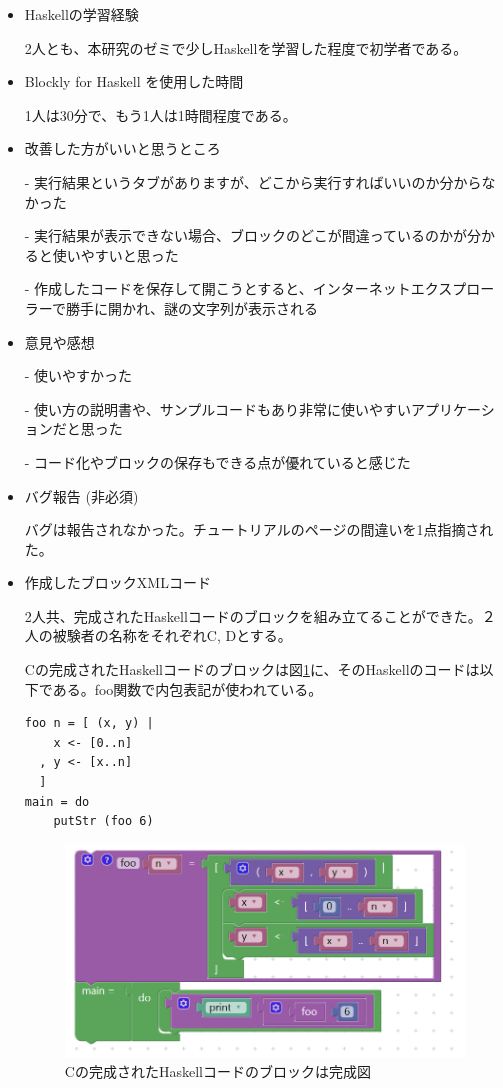 \documentclass{risepaper}
\begin{document}
\begin{itemize}
\item Haskellの学習経験

2人とも、本研究のゼミで少しHaskellを学習した程度で初学者である。

\item Blockly for Haskell を使用した時間

1人は30分で、もう1人は1時間程度である。

\item 改善した方がいいと思うところ

- 実行結果というタブがありますが、どこから実行すればいいのか分からなかった

- 実行結果が表示できない場合、ブロックのどこが間違っているのかが分かると使いやすいと思った

- 作成したコードを保存して開こうとすると、インターネットエクスプローラーで勝手に開かれ、謎の文字列が表示される

\item 意見や感想

- 使いやすかった

- 使い方の説明書や、サンプルコードもあり非常に使いやすいアプリケーションだと思った

- コード化やブロックの保存もできる点が優れていると感じた

\item バグ報告 (非必須)

バグは報告されなかった。チュートリアルのページの間違いを1点指摘された。

\item 作成したブロックXMLコード

2人共、完成されたHaskellコードのブロックを組み立てることができた。２人の被験者の名称をそれぞれC, Dとする。

Cの完成されたHaskellコードのブロックは図\ref{fig:haskell_experiment_result_c}に、そのHaskellのコードは以下である。foo関数で内包表記が使われている。
\begin{lstlisting}[basicstyle=\ttfamily\footnotesize]
foo n = [ (x, y) |
    x <- [0..n]
  , y <- [x..n]
  ]
main = do
    putStr (foo 6)
\end{lstlisting}

\begin{figure}[h]
\begin{center}
\includegraphics[scale=0.5]{img/haskell_experiment_result_c.PNG}
\caption{Cの完成されたHaskellコードのブロックは完成図}%
\label{fig:haskell_experiment_result_c}
\end{center}%
\end{figure}%


\end{itemize}
\end{document}
